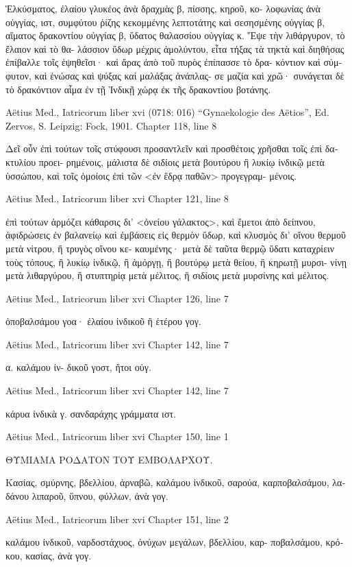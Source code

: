 \documentclass[12pt,letterpaper,twoside,final]{memoir}
\begin{document}
\begin{greek}
Ἑλκύσματος, ἐλαίου γλυκέος ἀνὰ δραχμὰς β, πίσσης, κηροῦ, κο-
λοφωνίας ἀνὰ οὐγγίας, ιστ, συμφύτου ῥίζης κεκομμένης λεπτοτάτης   
καὶ σεσησμένης οὐγγίας β, αἵματος δρακοντίου οὐγγίας β, ὕδατος 
θαλασσίου οὐγγίας κ. Ἕψε τὴν λιθάργυρον, τὸ ἔλαιον καὶ τὸ θα-
λάσσιον ὕδωρ μέχρις ἀμολύντου, εἶτα τήξας τὰ τηκτὰ καὶ διηθήσας 
ἐπίβαλλε τοῖς ἑψηθεῖσι· καὶ ἄρας ἀπὸ τοῦ πυρὸς ἐπίπασσε τὸ δρα-
κόντιον καὶ σύμφυτον, καὶ ἑνώσας καὶ ψύξας καὶ μαλάξας ἀνάπλας-
σε μαζία καὶ χρῶ· συνάγεται δὲ τὸ δρακόντιον αἷμα ἐν τῇ Ἰνδικῇ 
χώρᾳ ἐκ τῆς δρακοντίου βοτάνης. 



Aëtius Med., Iatricorum liber xvi (0718: 016)
“Gynaekologie des Aëtios”, Ed. Zervos, S.
Leipzig: Fock, 1901.
Chapter 118, line 8

                             Δεῖ οὖν ἐπὶ τούτων τοῖς στύφουσι 
προσαντλεῖν καὶ προσθέτοις χρῆσθαι τοῖς ἐπὶ δακτυλίου προει-
ρημένοις, μάλιστα δὲ σιδίοις μετὰ βουτύρου ἢ λυκίῳ ἰνδικῷ μετὰ 
ὑσσώπου, καὶ τοῖς ὁμοίοις ἐπὶ τῶν <ἐν ἕδρᾳ παθῶν> προγεγραμ-
μένοις. 



Aëtius Med., Iatricorum liber xvi 
Chapter 121, line 8

ἐπὶ τούτων ἁρμόζει κάθαρσις δι' <ὀνείου γάλακτος>, καὶ ἔμετοι 
ἀπὸ δείπνου, ἀφιδρώσεις ἐν βαλανείῳ καὶ ἐμβάσεις εἰς θερμὸν ὕδωρ, 
καὶ κλυσμὸς δι' οἴνου θερμοῦ μετὰ νίτρου, ἢ τρυγὸς οἴνου κε-
καυμένης· μετὰ δὲ ταῦτα θερμῷ ὕδατι καταχρίειν τοὺς τόπους, ἢ 
λυκίῳ ἰνδικῷ, ἢ ἀμόργῃ, ἢ βουτύρῳ μετὰ θείου, ἢ κηρωτῇ μυρσι-
νίνῃ μετὰ λιθαργύρου, ἢ στυπτηρίᾳ μετὰ μέλιτος, ἢ σιδίοις 
μετὰ μυρσίνης καὶ μέλιτος. 



Aëtius Med., Iatricorum liber xvi 
Chapter 126, line 7

   ὀποβαλσάμου γοα· ἐλαίου ἰνδικοῦ ἢ ἑτέρου γογ. 



Aëtius Med., Iatricorum liber xvi 
Chapter 142, line 7

                                                        α. καλάμου ἰν-
δικοῦ γοστ, ἤτοι οὐγ. 



Aëtius Med., Iatricorum liber xvi 
Chapter 142, line 7

                              κάρυα ἰνδικὰ γ. σανδαράχης γράμματα 
ιστ. 



Aëtius Med., Iatricorum liber xvi 
Chapter 150, line 1


  
ΘΥΜΙΑΜΑ ΡΟΔΑΤΟΝ ΤΟΥ ΕΜΒΟΛΑΡΧΟΥ.


       
 Κασίας, σμύρνης, βδελλίου, ἀρναβῶ, καλάμου ἰνδικοῦ, σαρούα, 
καρποβαλσάμου, λαδάνου λιπαροῦ, ὕπνου, φύλλων, ἀνὰ γογ. 



Aëtius Med., Iatricorum liber xvi 
Chapter 151, line 2

καλάμου ἰνδικοῦ, ναρδοστάχυος, ὀνύχων μεγάλων, βδελλίου, καρ-
ποβαλσάμου, κρόκου, κασίας, ἀνὰ γογ. 

\end{greek}
\end{document}
